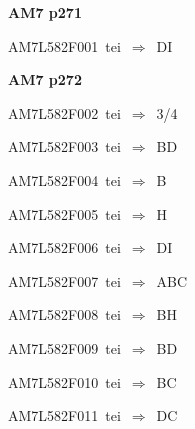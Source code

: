 \par\vfill\eject
{\bf\hfill AM7 p271\hfill\hbox{}}\par\bigskip
{\sixrm AM7L582F001\ {\sixit tei}\ }$\Rightarrow$\ DI\par\smallskip

\par\vfill\eject
{\bf\hfill AM7 p272\hfill\hbox{}}\par\bigskip
{\sixrm AM7L582F002\ {\sixit tei}\ }$\Rightarrow$\ 3/4\par\smallskip
{\sixrm AM7L582F003\ {\sixit tei}\ }$\Rightarrow$\ BD\par\smallskip
{\sixrm AM7L582F004\ {\sixit tei}\ }$\Rightarrow$\ B\par\smallskip
{\sixrm AM7L582F005\ {\sixit tei}\ }$\Rightarrow$\ H\par\smallskip
{\sixrm AM7L582F006\ {\sixit tei}\ }$\Rightarrow$\ DI\par\smallskip
{\sixrm AM7L582F007\ {\sixit tei}\ }$\Rightarrow$\ ABC\par\smallskip
{\sixrm AM7L582F008\ {\sixit tei}\ }$\Rightarrow$\ BH\par\smallskip
{\sixrm AM7L582F009\ {\sixit tei}\ }$\Rightarrow$\ BD\par\smallskip
{\sixrm AM7L582F010\ {\sixit tei}\ }$\Rightarrow$\ BC\par\smallskip
{\sixrm AM7L582F011\ {\sixit tei}\ }$\Rightarrow$\ DC\par\smallskip

